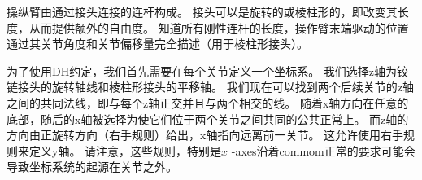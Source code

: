 
操纵臂由通过接头连接的连杆构成。 接头可以是旋转的或棱柱形的，即改变其长度，从而提供额外的自由度。 知道所有刚性连杆的长度，操作臂末端驱动的位置通过其关节角度和关节偏移量完全描述（用于棱柱形接头）。



为了使用DH约定，我们首先需要在每个关节定义一个坐标系。 我们选择z轴为铰链接头的旋转轴线和棱柱形接头的平移轴。 我们现在可以找到两个后续关节的z轴之间的共同法线，即与每个z轴正交并且与两个相交的线。 随着x轴方向在任意的底部，随后的x轴被选择为使它们位于两个关节之间共同的公共正常上。 而z轴的方向由正旋转方向（右手规则）给出，x轴指向远离前一关节。 这允许使用右手规则来定义y轴。 请注意，这些规则，特别是$ x $ -axes沿着commom正常的要求可能会导致坐标系统的起源在关节之外。 

